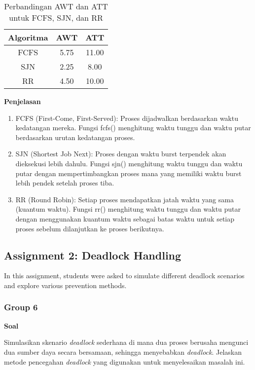 \documentclass[12pt]{article}
\begin{document}
\begin{table}
\centering
\begin{tabular}{|c|c|c|}
\hline
\textbf{Algoritma} & \textbf{AWT} & \textbf{ATT} \\ \hline
FCFS               & 5.75                                & 11.00                                  \\ \hline
SJN                & 2.25                                & 8.00                                  \\ \hline
RR                 & 4.50                                & 10.00                                 \\ \hline
\end{tabular}
\caption{Perbandingan AWT dan ATT untuk FCFS, SJN, dan RR}
\label{tab:comparison}
\end{table}
\textbf{Penjelasan}
\begin{enumerate}
    \item{FCFS (First-Come, First-Served)}: Proses dijadwalkan berdasarkan waktu kedatangan mereka. Fungsi fcfs() menghitung waktu tunggu dan waktu putar berdasarkan urutan kedatangan proses.
    \item{SJN (Shortest Job Next)}: Proses dengan waktu burst terpendek akan dieksekusi lebih dahulu. Fungsi sjn() menghitung waktu tunggu dan waktu putar dengan mempertimbangkan proses mana yang memiliki waktu burst lebih pendek setelah proses tiba.
    \item{RR (Round Robin)}: Setiap proses mendapatkan jatah waktu yang sama (kuantum waktu). Fungsi rr() menghitung waktu tunggu dan waktu putar dengan menggunakan kuantum waktu sebagai batas waktu untuk setiap proses sebelum dilanjutkan ke proses berikutnya.
\end{enumerate}

\subsection{Assignment 2: Deadlock Handling}
In this assignment, students were asked to simulate different deadlock scenarios and explore various prevention methods.

\subsubsection{Group 6}
\vspace{0.5cm}
\textbf{Soal}
\vspace{0.5cm}

Simulasikan skenario \textit{deadlock} sederhana di mana dua proses berusaha mengunci dua sumber daya secara bersamaan, sehingga menyebabkan \textit{deadlock}. Jelaskan metode pencegahan \textit{deadlock} yang digunakan untuk menyelesaikan masalah ini.
\end{document}
